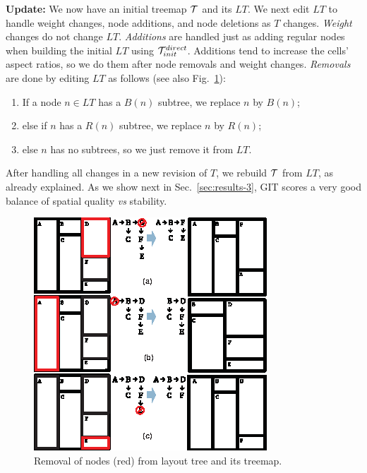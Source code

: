 \noindent\textbf{Update:} We now have an initial treemap ${\cal T}$ and its $LT$. We next edit $LT$ to handle weight changes, node additions, and node deletions as $T$ changes. \emph{Weight} changes do not change $LT$. \emph{Additions} are handled just as adding regular nodes when building the initial $LT$ using ${\cal T}_{init}^{direct}$. Additions tend to increase the cells' aspect ratios, so we do them after node removals and weight changes. \emph{Removals} are done by editing $LT$ as follows (see also Fig.~\ref{fig:git_removal}):

\begin{enumerate}
\item If a node $n\in LT$ has a $B(n)$ subtree, we replace $n$ by $B(n)$;
\item else if $n$ has a $R(n)$ subtree, we replace $n$ by $R(n)$;
\item else $n$ has no subtrees, so we just remove it from $LT$.
\end{enumerate}

After handling all changes in a new revision of $T$, we rebuild ${\cal T}$ from $LT$, as already explained. As we show next in Sec.~\ref{sec:results-3}, GIT scores a very good balance of spatial quality \emph{vs} stability.

\begin{figure}[htbp!]
\centering
\includegraphics[width=.9\textwidth]{figures/treemap-algorithm/git_removal.eps}
\caption{Removal of nodes (red) from layout tree and its treemap.}
\label{fig:git_removal}
\end{figure}


